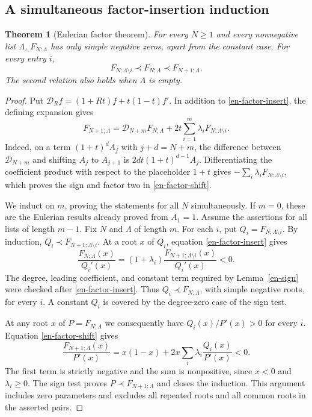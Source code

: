 \documentclass[12pt]{amsart}
\newtheorem{thm}{Theorem}[section]
\theoremstyle{definition}
\theoremstyle{remark}
\numberwithin{equation}{section}
\begin{document}
\subsection{A simultaneous factor-insertion induction}
\begin{samepage}
\begin{thm}[Eulerian factor theorem]\label{en-factor-theorem}
For every $N\geq1$ and every nonnegative list $\Lambda$, $F_{N;\Lambda}$ has only simple negative zeros, apart from the constant case. For every entry $i$,
\[
 F_{N;\Lambda\setminus i}\prec F_{N;\Lambda}
 \prec F_{N+1;\Lambda}.
\]
The second relation also holds when $\Lambda$ is empty.
\end{thm}
\end{samepage}
\begin{proof}
Put $\mathcal D_R f=(1+Rt)f+t(1-t)f'$. In addition to \eqref{en-factor-insert}, the defining expansion gives
\begin{equation}\label{en-factor-shift}
 F_{N+1;\Lambda}=\mathcal D_{N+m}F_{N;\Lambda}
                +2t\sum_{i=1}^m\lambda_i F_{N;\Lambda\setminus i}.
\end{equation}
Indeed, on a term $(1+t)^dA_j$ with $j+d=N+m$, the difference between $\mathcal D_{N+m}$ and shifting $A_j$ to $A_{j+1}$ is $2dt(1+t)^{d-1}A_j$. Differentiating the coefficient product with respect to the placeholder $1+t$ gives $-\sum_i\lambda_iF_{N;\Lambda\setminus i}$, which proves the sign and factor two in \eqref{en-factor-shift}.

We induct on $m$, proving the statements for all $N$ simultaneously. If $m=0$, these are the Eulerian results already proved from $A_1=1$. Assume the assertions for all lists of length $m-1$. Fix $N$ and $\Lambda$ of length $m$. For each $i$, put $Q_i=F_{N;\Lambda\setminus i}$. By induction,
$Q_i\prec F_{N+1;\Lambda\setminus i}$. At a root $x$ of $Q_i$, equation \eqref{en-factor-insert} gives
\[
 \frac{F_{N;\Lambda}(x)}{Q_i'(x)}
 =(1+\lambda_i)\frac{F_{N+1;\Lambda\setminus i}(x)}{Q_i'(x)}<0.
\]
The degree, leading coefficient, and constant term required by Lemma~\ref{en-sign} were checked after \eqref{en-factor-insert}. Thus $Q_i\prec F_{N;\Lambda}$, with simple negative roots, for every $i$. A constant $Q_i$ is covered by the degree-zero case of the sign test.

At any root $x$ of $P=F_{N;\Lambda}$ we consequently have $Q_i(x)/P'(x)>0$ for every $i$. Equation \eqref{en-factor-shift} gives
\[
 \frac{F_{N+1;\Lambda}(x)}{P'(x)}
 =x(1-x)+2x\sum_i\lambda_i\frac{Q_i(x)}{P'(x)}<0.
\]
The first term is strictly negative and the sum is nonpositive, since $x<0$ and $\lambda_i\geq0$. The sign test proves $P\prec F_{N+1;\Lambda}$ and closes the induction. This argument includes zero parameters and excludes all repeated roots and all common roots in the asserted pairs.
\end{proof}
\end{document}
